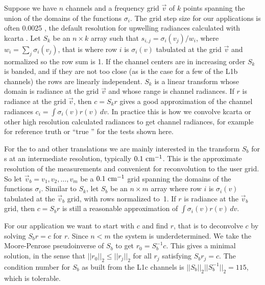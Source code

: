 \documentclass[10pt,twocolumn]{article}  %
\begin{document}
Suppose we have $n$ channels and a frequency grid $\vec v$ of 
$k$ points spanning the union of the domains of the functions
$\sigma_i$.  The grid step size for our applications is often 0.0025
{\wn}, the default resolution for upwelling radiances calculated
with kcarta \cite{kcarta1}.  Let $S_k$ be an $n\times k$ array such 
that $s_{i,j} = \sigma_i(v_j)/w_i$, where $w_i = \sum_j \sigma_i(v_j)$,
that is where row $i$ is $\sigma_i(v)$ tabulated at the grid $\vec
v$ and normalized so the row sum is 1.  If the channel centers are
in increasing order $S_k$ is banded, and if they are not too close
(as is the case for a few of the L1b channels) the rows are linearly
independent.  $S_k$ is a linear transform whose domain is radiance
at the grid $\vec v$ and whose range is channel radiances.  If $r$
is radiance at the grid $\vec v$, then $c = S_k r$ gives a good
approximation of the channel radiances $c_i = \int\sigma_i(v)r(v)\,dv$.
In practice this is how we convolve kcarta or other high resolution
calculated radiances to get {\airs} channel radiances, for example
for reference truth or ``true {\airs}'' for the tests shown here.


For the {\airs} to {\cris} and other translations we are mainly
interested in the transform $S_b$ for {\srf}s at an intermediate
resolution, typically $0.1~\mbox{cm$^{-1}$}$.  This is the approximate resolution
of the {\srf} measurements and convenient for reconvolution to the
{\cris} user grid.  So let $\vec v_b = v_1,v_2,\ldots,v_m$ be a
$0.1~\mbox{cm$^{-1}$}$ grid spanning the domains of the functions $\sigma_i$.
Similar to $S_k$, let $S_b$ be an $n\times m$ array where row $i$ is
$\sigma_i(v)$ tabulated at the $\vec v_b$ grid, with rows normalized
to~1.  If $r$ is radiance at the $\vec v_b$ grid, then $c = S_b r$
is still a reasonable approximation of $\int\sigma_i(v)r(v)\,dv$.

For our application we want to start with $c$ and find $r$, that is
to deconvolve $c$ by solving $S_b r = c$ for $r$.  Since $n < m$ the
system is underdetermined.  We take the Moore-Penrose pseudoinverse
\cite{wiki:pinv} of $S_b$ to get $r_0 = S_b^{-1} c$.  This gives a
minimal solution, in the sense that $||r_0||_2 \le ||r_j||_2$ for
all $r_j$ satisfying $S_b r_j = c$.  The condition number for $S_b$
as built from the L1c channels is $||S_b||_2||S_b^{-1}||_2 = 115$,
which is tolerable.
\end{document}
